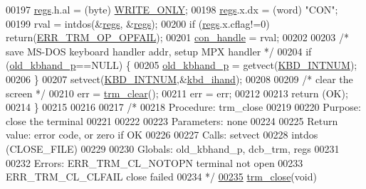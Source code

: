 \begin{DoxyCode}
00197         \hyperlink{trmdrive_8c_aaf347d1f75c4caba1a02aa49afc9324d}{regs}.h.al = (byte) \hyperlink{trmdrive_8c_afacd8708d4c64220663e1d08a8f4574d}{WRITE_ONLY};
00198         \hyperlink{trmdrive_8c_aaf347d1f75c4caba1a02aa49afc9324d}{regs}.x.dx = (word) \textcolor{stringliteral}{"CON"};
00199         rval = intdos(&\hyperlink{trmdrive_8c_aaf347d1f75c4caba1a02aa49afc9324d}{regs}, &\hyperlink{trmdrive_8c_aaf347d1f75c4caba1a02aa49afc9324d}{regs});
00200         \textcolor{keywordflow}{if} (\hyperlink{trmdrive_8c_aaf347d1f75c4caba1a02aa49afc9324d}{regs}.x.cflag!=0) \textcolor{keywordflow}{return}(\hyperlink{trmdrive_8h_aa690cb6d0876fcaacd02349985603865}{ERR_TRM_OP_OPFAIL});
00201         \hyperlink{trmdrive_8c_a679f108c9d4e6b006d00e83ec2a4aa96}{con_handle} = rval;
00202 
00203         \textcolor{comment}{/* save MS-DOS keyboard handler addr, setup MPX handler */}
00204         \textcolor{keywordflow}{if} (\hyperlink{trmdrive_8c_ae0117ec71cfad7cb444a3af48e82db69}{old_kbhand_p}==NULL) \{
00205                 \hyperlink{trmdrive_8c_ae0117ec71cfad7cb444a3af48e82db69}{old_kbhand_p} = getvect(\hyperlink{trmdrive_8c_a52651037a009b9f7f5f5c3bc16338855}{KBD_INTNUM});
00206         \}
00207         setvect(\hyperlink{trmdrive_8c_a52651037a009b9f7f5f5c3bc16338855}{KBD_INTNUM},&\hyperlink{trmdrive_8c_aebfcd164b5b67675c3d7f86be3f68e94}{kbd_ihand});
00208 
00209         \textcolor{comment}{/* clear the screen */}
00210         err = \hyperlink{trmdrive_8c_ae586641189b36f988e24e938899d2dee}{trm_clear}();
00211         err = err;
00212 
00213         \textcolor{keywordflow}{return} (OK);
00214 \}
00215 
00216 
00217 \textcolor{comment}{/*}
00218 \textcolor{comment}{        Procedure: trm\_close}
00219 \textcolor{comment}{}
00220 \textcolor{comment}{        Purpose: close the terminal}
00221 \textcolor{comment}{}
00222 \textcolor{comment}{}
00223 \textcolor{comment}{        Parameters:     none    }
00224 \textcolor{comment}{}
00225 \textcolor{comment}{        Return value: error code, or zero if OK}
00226 \textcolor{comment}{}
00227 \textcolor{comment}{        Calls:  setvect}
00228 \textcolor{comment}{                intdos (CLOSE\_FILE)}
00229 \textcolor{comment}{}
00230 \textcolor{comment}{        Globals: old\_kbhand\_p, dcb\_trm, regs}
00231 \textcolor{comment}{}
00232 \textcolor{comment}{        Errors: ERR\_TRM\_CL\_NOTOPN       terminal not open}
00233 \textcolor{comment}{                ERR\_TRM\_CL\_CLFAIL       close failed}
00234 \textcolor{comment}{*/}
\hypertarget{trmdrive_8c_source_l00235}{}\hyperlink{trmdrive_8h_ae63092252bd7a24cbaacad2fef6332d2}{00235} \hyperlink{trmdrive_8c_a1d9a258c2f0a3e831fa856102e4d7484}{trm_close}(\textcolor{keywordtype}{void})

\end{DoxyCode}
